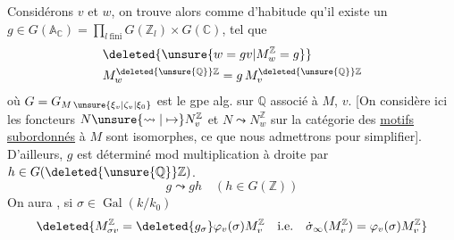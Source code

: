 Considérons $v$ et $w$, on trouve alors  comme d'habitude qu'il existe un $g\in G(\mathbb A_{\mathbb C})=\prod_{l\ \mathrm{fini}}G(\mathbb Z_l)\times G(\mathbb C)$,
tel que
\[
\begin{aligned}
&\deleted{\unsure{w=g v|M_w^{\mathbb Z}=g}}\\
&M_w^{\deleted{\unsure{\mathbb Q}}\mathbb Z}=g\,M_v^{\deleted{\unsure{\mathbb Q}}\mathbb Z}
\end{aligned}
\]
où $G=G_{M\,\unsure{\xi_v|\zeta_v|\xi_0}}$ est le gpe alg. sur $\mathbb Q$ associé à $M$, $v$. [On considère ici les foncteurs $N\unsure{\leadsto|\mapsto}N_v^{\mathbb Z}$ et $N\leadsto N_w^{\mathbb Z}$ sur la catégorie des \uline{motifs} \uline{subordonnés} à $M$ sont isomorphes, ce que nous admettrons pour simplifier].
D'ailleurs, $g$ est déterminé mod multiplication à droite par $h\in G(\deleted{\unsure{\mathbb Q}}\mathbb Z)$.
\[
g\leadsto gh\quad(h\in G(\mathbb Z))
\]
 On aura , si $\sigma\in\operatorname{Gal}(k/k_0)$
\[
\deleted{M_{\sigma v}^{\mathbb Z}=\deleted{g_\sigma}\varphi_v(\sigma)M_v^{\mathbb Z}\quad\text{i.e.}\quad\dot{\sigma}_\infty(M_v^{\mathbb Z})=\varphi_v(\sigma)M_v^{\mathbb Z}}
\]
